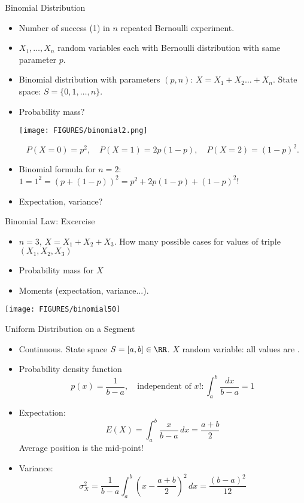 \documentclass[9pt]{beamer}
\newcommand{\myemph}[1]{{\color{blue}{#1}}}
\begin{document}
\begin{frame}[t]{Binomial Distribution}
  \begin{itemize}
  \item Number of success (1) in $n$ repeated Bernoulli experiment.
  \item $X_1,\dots,X_n$ random variables each with Bernoulli distribution with same parameter $p$.
  \item Binomial distribution with parameters $(p,n)$: $X = X_1+ X_2\dots+X_n$. State space: $S = \{0,1,\dots, n\}$.
  \item Probability mass?
    \begin{center}
      \texttt{[image: FIGURES/binomial2.png]}
    \end{center}
    $$
    P(X = 0) = p^2,\quad P(X=1) = 2p(1-p),\quad P(X=2) = (1-p)^2.
    $$
    \item Binomial formula for $n=2$: $1 = 1^2 = (p + (1-p))^2 = p^2 + 2p(1-p) + (1-p)^2$!
    \item Expectation, variance?
  \end{itemize}
\end{frame}



\begin{frame}[t]{Binomial Law: Excercise}
  \begin{itemize}
  \item $n=3$, $X = X_1+X_2+X_3$. How many possible cases for values of triple $(X_1,X_2,X_3)$
  \item Probability mass for $X$
  \item Moments (expectation, variance...).
  \end{itemize}
  \begin{center}
    \texttt{[image: FIGURES/binomial50]}
  \end{center}
\end{frame}


\begin{frame}[t]{Uniform Distribution on a Segment}
  \begin{itemize}
  \item Continuous. State space $S = [a,b]\in\RR$. $X$ random variable: all values are \myemph{equiprobable}.
  \item Probability density function
    $$
    p(x) = \frac{1}{b-a},\quad\text{independent of }x!: \int_a^b\frac{dx}{b-a} = 1
    $$
  \item Expectation:
    $$
    E(X) = \int_a^b\frac{x}{b-a} \,dx = \frac{a+b}{2}
    $$
    Average position is the mid-point!
  \item Variance:
    $$
    \sigma_X^2 =  \frac{1}{b-a}\int_a^b  \left(x-\frac{a+b}{2}\right)^2\,dx = \frac{(b-a)^2}{12}
    $$
  \end{itemize}
\end{frame}
\end{document}
